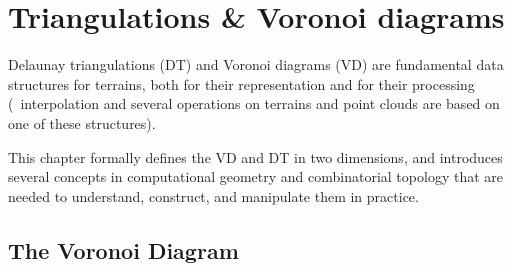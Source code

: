 
\graphicspath{{dtvd/}}


\newcommand{\Orient}{O\textsc{rientation}\xspace}
\newcommand{\walk}{W\textsc{alk}\xspace}
\newcommand{\Incircle}{I\textsc{n}C\textsc{ircle}\xspace}

\chapter{Triangulations \& Voronoi diagrams}%
\label{chap:dtvd}

Delaunay triangulations (DT) and Voronoi diagrams (VD) are fundamental data structures for terrains, both for their representation and for their processing (\eg\ interpolation and several operations on terrains and point clouds are based on one of these structures).

%

This chapter formally defines the VD and DT in two dimensions, and introduces several concepts in computational geometry and combinatorial topology that are needed to understand, construct, and manipulate them in practice. 


\section{The Voronoi Diagram}

